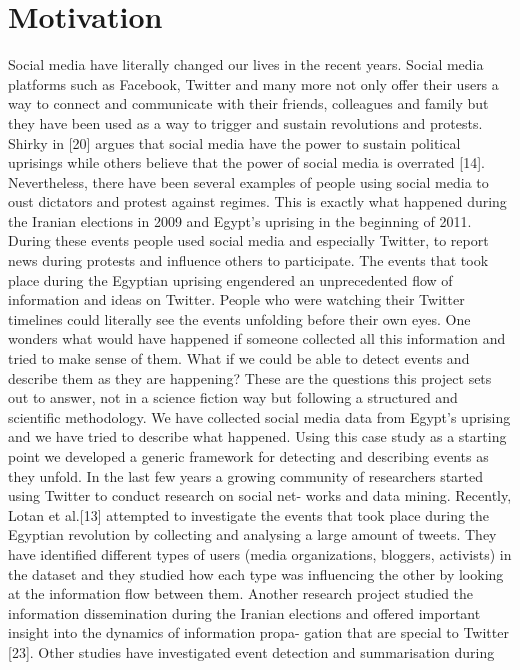 \section{Motivation}
Social media have literally changed our lives in the recent years. Social media platforms such as Facebook, Twitter
and many more not only offer their users a way to connect and communicate with their friends, colleagues and
family but they have been used as a way to trigger and sustain revolutions and protests. Shirky in [20] argues that
social media have the power to sustain political uprisings while others believe that the power of social media is
overrated [14]. Nevertheless, there have been several examples of people using social media to oust dictators and
protest against regimes. This is exactly what happened during the Iranian elections in 2009 and Egypt's uprising in
the beginning of 2011. During these events people used social media and especially Twitter, to report news during
protests and influence others to participate.
The events that took place during the Egyptian uprising engendered an unprecedented flow of information and
ideas on Twitter. People who were watching their Twitter timelines could literally see the events unfolding 
before their own eyes. One wonders what would have happened if someone collected all this information and tried
to make sense of them. What if we could be able to detect events and describe them as they are happening?
These are the questions this project sets out
to answer, not in a science fiction way but following a structured and scientific methodology. We have collected
social media data from Egypt's uprising and we have tried to describe what happened. Using this case study as a 
starting point we developed a generic framework for detecting and describing events as they unfold.
In the last few years a growing community of researchers started using Twitter to conduct research on social net-
works and data mining. Recently, Lotan et al.[13] attempted to investigate the events that took place during the
Egyptian revolution by collecting and analysing a large amount of tweets. They have identified different types
of users (media organizations, bloggers, activists) in the dataset and they studied how each type was influencing
the other by looking at the information flow between them. Another research project studied the information
dissemination during the Iranian elections and offered important insight into the dynamics of information propa-
gation that are special to Twitter [23]. Other studies have investigated event detection and summarisation during
